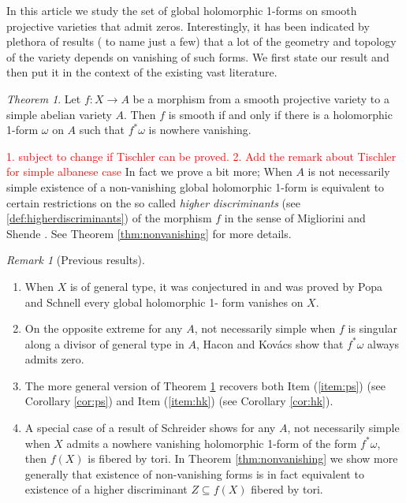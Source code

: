 \documentclass[a4paper,12pt,reqno]{amsart}
\theoremstyle{plain}
\theoremstyle{remark}
\newtheorem{remark}[theorem]{Remark}
\newtheorem{alphtheorem}{Theorem}
\newcommand{\sorry}[1]{\textcolor{red}{#1}}
\begin{document}
In this article we study the set of global holomorphic 1-forms  on smooth projective varieties that admit zeros. Interestingly, it has been
indicated by plethora of results (\cite{HK05, LZ05, EL,
SS19, SH19, PS14} to name just a few) that a lot of the geometry
and topology of the variety depends on vanishing of such forms.
We first state our result and then put it in the context of 
the existing vast literature.
\begin{alphtheorem}\label{thm:smooth}
Let $f:X\to A$ be a morphism from a smooth projective variety to a simple abelian variety $A$. Then $f$ is smooth if and only if there is a holomorphic 1-form $\omega$ on $A$ such that $f^*\omega$ is nowhere vanishing. 
\end{alphtheorem}
\sorry{1. subject to change if Tischler can be proved. 2. Add the remark about Tischler for simple albanese case}
In fact we prove a bit more; When $A$ is not necessarily simple
existence of a non-vanishing global holomorphic 1-form
is equivalent to certain restrictions on the so called \emph{higher discriminants} (see \ref{def:higherdiscriminants}) of the morphism $f$ in the sense
of Migliorini and Shende \cite{MiSh18}.
See Theorem \ref{thm:nonvanishing} for more details.
\begin{remark}[Previous results]
\begin{enumerate}
\item \label{item:ps} When $X$ is of general type, it was conjectured in
	\cite{HK05, LZ05} and was proved
	by Popa and Schnell \cite{PS14} every global holomorphic 1-		
	form vanishes on $X$. 
\item \label{item:hk} On the opposite extreme for any $A$, not necessarily simple when $f$ is singular along a divisor of general
		type in $A$, Hacon and Kov\'acs \cite[Proposition 3.5.]{HK05} show that
		$f^*\omega$ always admits zero.
\item The more general version of Theorem \ref{thm:smooth}
recovers both Item (\ref{item:ps}) (see Corollary \ref{cor:ps})
and Item (\ref{item:hk}) (see Corollary \ref{cor:hk}).
\item A special case of a result of 
Schreider \cite[Corollary 1.5]{SS19} shows for any $A$, not necessarily simple when $X$
admits a nowhere vanishing holomorphic 1-form of the form
$f^*\omega$, then $f(X)$ is fibered by tori. In 
Theorem \ref{thm:nonvanishing} we show more generally that 
existence of non-vanishing forms is in fact equivalent to existence of a higher discriminant $Z\subseteq f(X)$ fibered by tori. 
\end{enumerate}
\end{remark}
\end{document}
